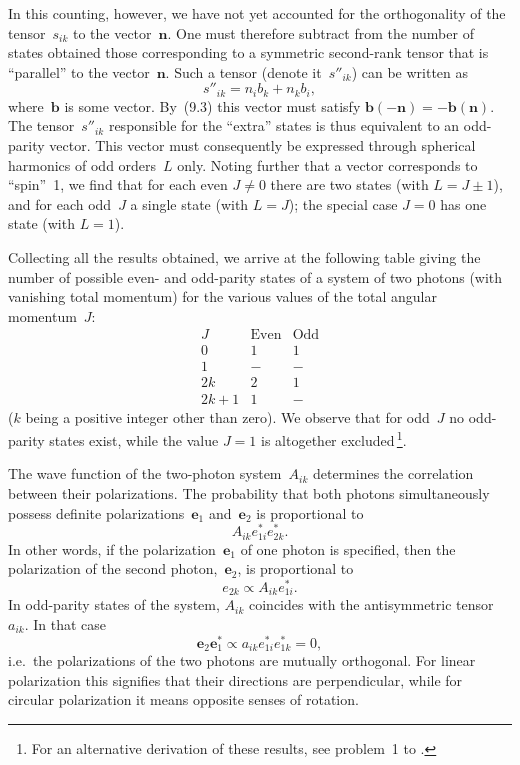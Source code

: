 In this counting, however, we have not yet accounted for the orthogonality of the tensor~$s_{ik}$ to the vector~$\mathbf{n}$. One must therefore subtract from the number of states obtained those corresponding to a symmetric second-rank tensor that is ``parallel'' to the vector~$\mathbf{n}$. Such a tensor (denote it~$s''_{ik}$) can be written as
\[
s''_{ik} = n_ib_k + n_kb_i,
\]
where~$\mathbf{b}$ is some vector. By~(9.3) this vector must satisfy $\mathbf{b}(-\mathbf{n}) = -\mathbf{b}(\mathbf{n})$. The tensor~$s''_{ik}$ responsible for the ``extra'' states is thus equivalent to an odd-parity vector. This vector must consequently be expressed through spherical harmonics of odd orders~$L$ only. Noting
further that a vector corresponds to ``spin''~1, we find that for each even $J \neq 0$ there are two states (with $L = J \pm 1$), and for each odd~$J$ a single state (with $L = J$); the special case $J = 0$ has one state (with $L = 1$).

Collecting all the results obtained, we arrive at the following table giving the number of possible even- and odd-parity states of a system of two photons (with vanishing total momentum) for the various values of the total angular momentum~$J$:
\begin{equation}
\begin{array}{c|c|c}
J & \text{Even} & \text{Odd} \\ \hline
0 & 1 & 1 \\
1 & - & - \\
2k & 2 & 1 \\
2k+1 & 1 & -
\end{array}
\tag{9.5}
\end{equation}
($k$ being a positive integer other than zero). We observe that for odd~$J$ no odd-parity states exist, while the value $J = 1$ is altogether excluded\,\footnote{For an alternative derivation of these results, see problem~1 to .}.

The wave function of the two-photon system~$A_{ik}$ determines the correlation between their polarizations. The probability that both photons simultaneously possess definite polarizations~$\mathbf{e}_1$ and~$\mathbf{e}_2$ is proportional to
\[
A_{ik}e_{1i}^*e_{2k}^*.
\]
In other words, if the polarization~$\mathbf{e}_1$ of one photon is specified, then the polarization of the second photon,~$\mathbf{e}_2$, is proportional to
\begin{equation}
e_{2k} \propto A_{ik}e_{1i}^*.
\tag{9.6}
\end{equation}
In odd-parity states of the system, $A_{ik}$ coincides with the antisymmetric tensor~$a_{ik}$. In that case
\[
\mathbf{e}_2\mathbf{e}_1^* \propto a_{ik}e_{1i}^*e_{1k}^* = 0,
\]
i.e.\ the polarizations of the two photons are mutually orthogonal. For linear polarization this signifies that their directions are perpendicular, while for circular polarization it means opposite senses of rotation.

